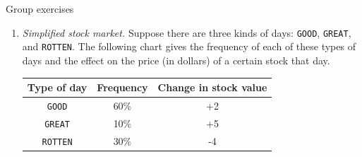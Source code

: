 \documentclass[10pt]{beamer}
\begin{document}
\begin{frame}{Group exercises}
\footnotesize 
\begin{enumerate}
	\item \textit{Simplified stock market.} Suppose there are three kinds of days: \texttt{GOOD}, \texttt{GREAT}, and \texttt{ROTTEN}. The following chart gives the frequency of each of these types of days and the effect on the price (in dollars) of a certain stock that day.
	
	\begin{table}[H]
	\begin{tabular}{|c|c|c|}
	\toprule 
	\colorbox{blue!30}{Type of day} & 	\colorbox{blue!30}{Frequency} & \colorbox{blue!30}{Change in stock value} \\
	\midrule 
	\texttt{GOOD} & 60\% & +2 \\
	\texttt{GREAT} & 10\% & +5 \\
	\texttt{ROTTEN} & 30\% & -4 \\
	\bottomrule 
	\end{tabular}
	\end{table}
	

\end{enumerate}
\end{frame}
\end{document}
